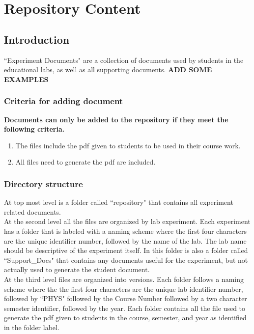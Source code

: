 \documentclass[justified]{pjlProcessDocs}
\begin{document}
\chapter{Repository Content}\label{chap:expDocs}

\section{Introduction}

``Experiment Documents" are a collection of documents used by students in the educational labs, as well as all supporting documents. {\bf ADD SOME EXAMPLES} \\

\subsection{Criteria for adding document}

{\bf Documents can only be added to the repository if they meet the following criteria.}
\begin{enumerate}
\item The files include the pdf given to students to be used in their course work.
\item All files need to generate the pdf are included.
\end{enumerate}

\subsection{Directory structure}

At top most level is a folder called ``repository" that contains all experiment related documents.\\

\noindent At the second level all the files are organized by lab experiment. Each experiment has a folder that is labeled with a naming scheme where the first four characters are the unique identifier number, followed by the name of the lab. The lab name should be descriptive of the experiment itself. In this folder is also a folder called ``Support\_Docs" that contains any documents useful for the experiment, but not actually used to generate the student document. \\

\noindent At the third level files are organized into versions. Each folder follows a naming scheme where the the first four characters are the unique lab identifier number, followed by ``PHYS" followed by the Course Number followed by a two character semester identifier, followed by the year. Each folder contains all the file used to generate the pdf given to students in the course, semester, and year as identified in the folder label. \\
\end{document}
